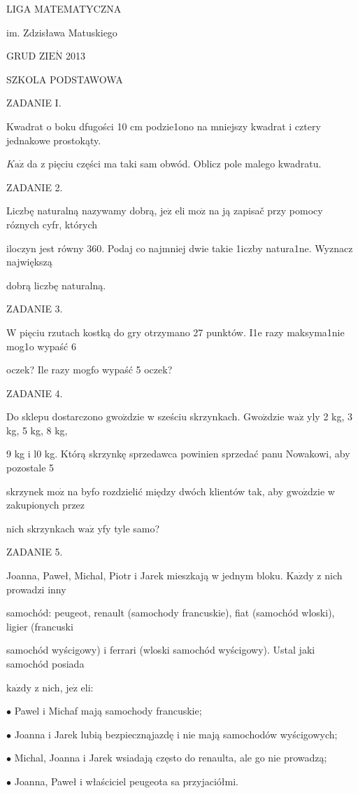 \documentclass[a4paper,12pt]{article}
\begin{document}
LIGA MATEMATYCZNA

im. Zdzisława Matuskiego

GRUD Z$\mathrm{I}\mathrm{E}\acute{\mathrm{N}}$ 2013

SZKOLA PODSTAWOWA

ZADANIE I.

Kwadrat o boku dfugości 10 cm podzie1ono na mniejszy kwadrat i cztery jednakowe prostokąty.

$K\mathrm{a}\dot{\mathrm{z}}$ da z pięciu części ma taki sam obwód. Oblicz pole malego kwadratu.

ZADANIE 2.

Liczbę naturalną nazywamy dobrą, $\mathrm{j}\mathrm{e}\dot{\mathrm{z}}$ eli $\mathrm{m}\mathrm{o}\dot{\mathrm{z}}$ na ją zapisač przy pomocy róznych cyfr, których

iloczyn jest równy 360. Podaj co najmniej dwie takie 1iczby natura1ne. Wyznacz największą

dobrą liczbę naturalną.

ZADANIE 3.

W pięciu rzutach kostką do gry otrzymano 27 punktów. I1e razy maksyma1nie mog1o wypaść 6

oczek? Ile razy mogfo wypaść 5 oczek?

ZADANIE 4.

Do sklepu dostarczono $\mathrm{g}\mathrm{w}\mathrm{o}\acute{\mathrm{z}}$dzie w sześciu skrzynkach. $\mathrm{G}\mathrm{w}\mathrm{o}\acute{\mathrm{z}}$dzie $\mathrm{w}\mathrm{a}\dot{\mathrm{z}}$ yly 2 kg, 3 kg, 5 kg, 8 kg,

9 kg i l0 kg. Którą skrzynkę sprzedawca powinien sprzedać panu Nowakowi, aby pozostale 5

skrzynek $\mathrm{m}\mathrm{o}\dot{\mathrm{z}}$ na byfo rozdzielić między dwóch klientów tak, aby $\mathrm{g}\mathrm{w}\mathrm{o}\acute{\mathrm{z}}$dzie w zakupionych przez

nich skrzynkach $\mathrm{w}\mathrm{a}\dot{\mathrm{z}}$ yfy tyle samo?

ZADANIE 5.

Joanna, Paweł, Michal, Piotr i Jarek mieszkają w jednym bloku. $\mathrm{K}\mathrm{a}\dot{\mathrm{z}}\mathrm{d}\mathrm{y}$ z nich prowadzi inny

samochód: peugeot, renault (samochody francuskie), fiat (samochód wloski), ligier (francuski

samochód wyścigowy) i ferrari (wloski samochód wyścigowy). Ustal jaki samochód posiada

$\mathrm{k}\mathrm{a}\dot{\mathrm{z}}\mathrm{d}\mathrm{y}$ z nich, $\mathrm{j}\mathrm{e}\dot{\mathrm{z}}$ eli:

$\bullet$ Pawel i Michaf mają samochody francuskie;

$\bullet$ Joanna i Jarek lubią bezpiecznąjazdę i nie mają samochodów wyścigowych;

$\bullet$ Michal, Joanna i Jarek wsiadają często do renaulta, ale go nie prowadzą;

$\bullet$ Joanna, Paweł i właściciel peugeota sa przyjaciółmi.
\end{document}
